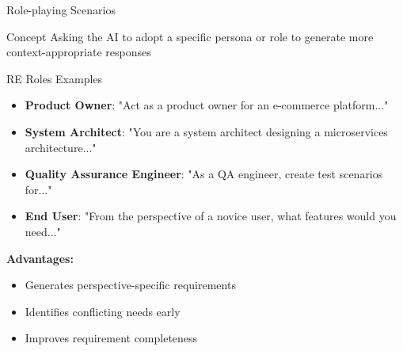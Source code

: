\documentclass{beamer}
\begin{document}
\begin{frame}{Role-playing Scenarios}
    \begin{block}{Concept}
        Asking the AI to adopt a specific persona or role to generate more context-appropriate responses
    \end{block}
    
    \begin{exampleblock}{RE Roles Examples}
        \begin{itemize}
            \item \textbf{Product Owner}: "Act as a product owner for an e-commerce platform..."
            \item \textbf{System Architect}: "You are a system architect designing a microservices architecture..."
            \item \textbf{Quality Assurance Engineer}: "As a QA engineer, create test scenarios for..."
            \item \textbf{End User}: "From the perspective of a novice user, what features would you need..."
        \end{itemize}
    \end{exampleblock}
    
    \textbf{Advantages:}
    \begin{itemize}
        \item Generates perspective-specific requirements
        \item Identifies conflicting needs early
        \item Improves requirement completeness
    \end{itemize}
\end{frame}
\end{document}
